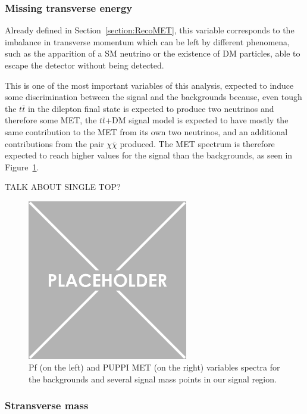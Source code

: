 \documentclass[a4paper, 10pt, openright]{report}
\begin{document}
\subsubsection*{Missing transverse energy}

Already defined in Section~\ref{section:RecoMET}, this variable corresponds to the imbalance in transverse momentum which can be left by different phenomena, such as the apparition of a \ac{SM} neutrino or the existence of \ac{DM} particles, able to escape the detector without being detected.

This is one of the most important variables of this analysis, expected to induce some discrimination between the signal and the backgrounds because, even tough the $t \bar t$ in the dilepton final state is expected to produce two neutrinos and therefore some \ac{MET}, the $t \bar t$+DM signal model is expected to have mostly the same contribution to the \ac{MET} from its own two neutrinos, and an additional contributions from the pair $\chi \bar \chi$ produced. The \ac{MET} spectrum is therefore expected to reach higher values for the signal than the backgrounds, as seen in Figure~\ref{fig:SRdiscMET}.

\color{red} TALK ABOUT SINGLE TOP? \color{black}

\begin{figure}[htbp]
\centering
\includegraphics[width=7cm, height=7cm]{figs/placeholder.png}
\caption{Pf (on the left) and \ac{PUPPI} \ac{MET} (on the right) variables spectra for the backgrounds and several signal mass points in our signal region.}
\label{fig:SRdiscMET}
\end{figure}

\subsubsection*{Stransverse mass}
\end{document}
